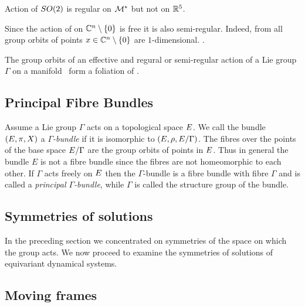 \begin{example}
 Action  of $SO(2)$ is regular on $\mathcal{M}^*$ but not on $\mathbb{R}^{5}$.
\end{example}


\begin{example}
Since the action  of  on $\mathbb{C}^{n}\setminus\{0\}$ is free it is also semi-regular. Indeed, from  all group orbits of points $x\in\mathbb{C}^{n}\setminus\{0\}$ are $1$-dimensional.
.
\end{example}

The group orbits of an effective and regural or semi-regular action of a Lie group $\Gamma$ on a manifold \Manif\ form a foliation of \Manif{}. 






\subsection{Principal Fibre Bundles}

Assume a Lie group $\Gamma$ acts on a topological space $E$. We call the bundle $(E,\pi,X)$ a \emph{$\Gamma$-bundle} if it is isomorphic to $(E,\rho,E/\Gamma)$. The fibres over the points of the base space $E/\Gamma$ are the group orbits of points in $E$. 
Thus in general  the bundle $E$ is not a fibre bundle since the fibres are not homeomorphic to each other. If $\Gamma$ acts freely on
$E$ then the $\Gamma$-bundle is a fibre bundle with fibre $\Gamma$ and is called a \emph{principal $\Gamma$-bundle}, while $\Gamma$ is called the structure group of the bundle.

\subsection{Symmetries of solutions}

In the preceding section we concentrated on symmetries of the space on which the group acts.
We now proceed to examine the symmetries of solutions of equivariant dynamical systems.


\subsection{Moving frames}

